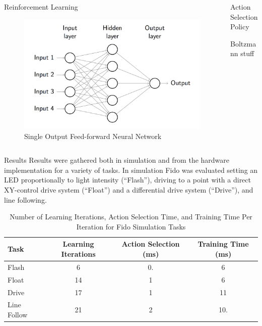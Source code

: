 \documentclass[final]{beamer}
\newlength{\onecolwid}
\newlength{\twocolwid}
\begin{document}
\begin{frame}[t]
\begin{columns}[t]
\begin{column}{\twocolwid}
\begin{columns}[t,totalwidth=\twocolwid]
\begin{column}{\onecolwid}
\begin{block}{Reinforcement Learning}
	\begin{figure}
		\centering
		\includegraphics[width=.8\linewidth]{Figures/FeedForwardRendered}
		\caption{Single Output Feed-forward Neural Network}
		\label{fig:feedforward}
	\end{figure}

\end{block}\end{column}

\begin{column}{\onecolwid}\begin{block}{Action Selection Policy}
	
	Boltzmann stuff

\end{block}\end{column} 

\end{columns} 

	\begin{block}{Results}
		Results were gathered both in simulation and from the hardware implementation for a variety of tasks.  In simulation Fido was evaluated setting an LED proportionally to light intensity (``Flash''), driving to a point with a direct XY-control drive system (``Float'') and a differential drive system (``Drive''), and line following.

		\begin{table}[ht]
			\centering
			\begin{tabular}{@{}lccc@{}}
				\toprule
				Task        & Learning Iterations & Action Selection (ms) & Training Time (ms) \\ \midrule
				Flash       & 6                   & 0.                  & 6               \\
				Float       & 14                  & 1                  & 6               \\
				Drive       & 17                  & 1                  & 11              \\
				Line Follow & 21                  & 2                  & 10.               \\ \bottomrule
			\end{tabular}
			\caption{Number of Learning Iterations, Action Selection Time, and Training Time Per Iteration for Fido Simulation Tasks}
			\label{tab:data}
		\end{table}


\end{block}
\end{column}
\end{columns}
\end{frame}
\end{document}
